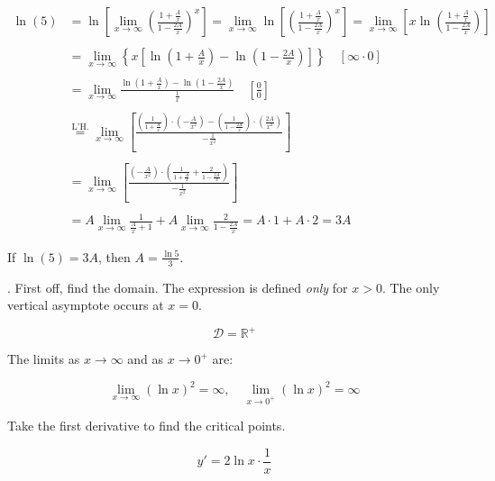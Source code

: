 \documentclass{article}
\begin{document}
\begin{align*}
\ln(5)&=\ln\left[\lim_{x\to\infty}\left(\frac{\displaystyle1+\frac Ax}{\displaystyle1-\frac {2A}x}\right)^{x}\right]=\lim_{x\to\infty}\ln\left[\left(\frac{\displaystyle1+\frac Ax}{\displaystyle1-\frac {2A}x}\right)^{x}\right]=\lim_{x\to\infty}\left[x\ln\left(\frac{\displaystyle1+\frac Ax}{\displaystyle1-\frac {2A}x}\right)\right]\\\\&=\lim_{x\to\infty}\left\{x\left[\ln\left(1+\frac Ax\right)-\ln\left(1-\frac {2A}x\right)\right]\right\}\quad\left[\infty\cdot0\right]\\\\&=\lim_{x\to\infty}\frac{\displaystyle\ln\left(1+\frac Ax\right)-\ln\left(1-\frac {2A}x\right)}{\displaystyle\frac1x}\quad\left[\frac00\right]\\\\&\overset{\text{L'H.}}{=}\lim_{x\to\infty}\left[\frac{\displaystyle\left(\frac1{1+\frac Ax}\right)\cdot\left(-\frac{A}{x^2}\right)-\left(\frac1{1-\frac{2A}x}\right)\cdot\left(\frac{2A}{x^2}\right)}{\displaystyle -\frac1{x^2}}\right]\\\\&=\lim_{x\to\infty}\left[\frac{\displaystyle\left(-\frac{A}{x^2}\right)\cdot\left(\frac1{1+\frac{A}x}+\frac{2}{1-\frac{2A}x}\right)}{\displaystyle-\frac{1}{x^2}}\right]\\\\&=A\lim_{x\to\infty}\frac1{\frac Ax + 1}+A\lim_{x\to\infty}\frac2{1-\frac{2A}x} = A \cdot 1 + A \cdot 2 = 3A
\end{align*}

\hfill

\noindent If $\ln(5) = 3A$, then $\boxed{A =\frac{\ln5}3}$.

\hfill

. First off, find the domain. The expression is defined \textit{only} for $x>0$. The only vertical asymptote occurs at $x=0$.

\[\mathcal{D} = \mathbb{R}^+\]

\hfill

\noindent The limits as $x\to\infty$ and as $x\to0^+$ are:

\[\lim_{x\to \infty}(\ln x)^2=\infty,\quad \lim_{x\to0^+}(\ln x)^2=\infty \]

\hfill

\noindent Take the first derivative to find the critical points.

\[y'=2\ln x\cdot\frac1x\]
\end{document}
